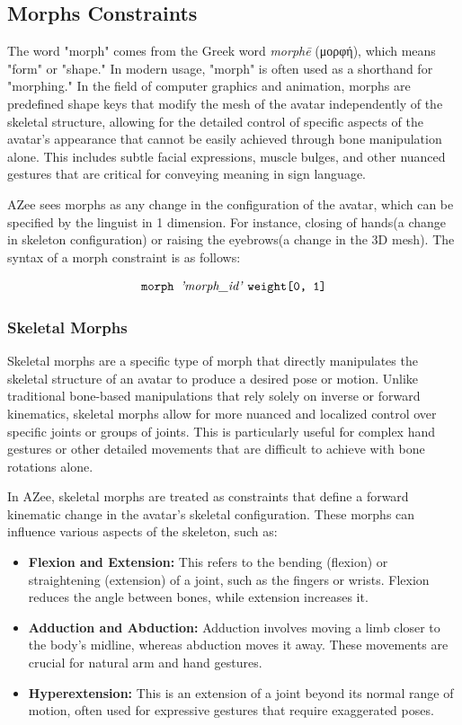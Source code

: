 \documentclass[../../main.tex]{subfiles}
\begin{document}
\subsection{Morphs Constraints}
\label{ch:rigging_layers:proc_rig_signing_avatars:morph_constraints}

The word "morph" comes from the Greek word \textit{morphē} (\textgreek{μορφή}), which means "form" or "shape." In modern usage, "morph" is often used as a shorthand for "morphing." In the field of computer graphics and animation, morphs are predefined shape keys that modify the mesh of the avatar independently of the skeletal structure, allowing for the detailed control of specific aspects of the avatar's appearance that cannot be easily achieved through bone manipulation alone. This includes subtle facial expressions, muscle bulges, and other nuanced gestures that are critical for conveying meaning in sign language.

AZee sees morphs as any change in the configuration of the avatar, which can be specified by the linguist in 1 dimension. For instance, closing of hands(a change in skeleton configuration) or raising the eyebrows(a change in the 3D mesh). The syntax of a morph constraint is as follows:

\[
\texttt{morph } \text{\emph{'morph\_id'}} \ \texttt{weight[0, 1]}
\]

\subsubsection{Skeletal Morphs}
\label{ch:rigging_layers:proc_rig_signing_avatars:morph_constraints:skel_morphs}

Skeletal morphs are a specific type of morph that directly manipulates the skeletal structure of an avatar to produce a desired pose or motion. Unlike traditional bone-based manipulations that rely solely on inverse or forward kinematics, skeletal morphs allow for more nuanced and localized control over specific joints or groups of joints. This is particularly useful for complex hand gestures or other detailed movements that are difficult to achieve with bone rotations alone.

In AZee, skeletal morphs are treated as constraints that define a forward kinematic change in the avatar's skeletal configuration. These morphs can influence various aspects of the skeleton, such as:

\begin{itemize}
    \item \textbf{Flexion and Extension:} This refers to the bending (flexion) or straightening (extension) of a joint, such as the fingers or wrists. Flexion reduces the angle between bones, while extension increases it.
    \item \textbf{Adduction and Abduction:} Adduction involves moving a limb closer to the body's midline, whereas abduction moves it away. These movements are crucial for natural arm and hand gestures.
    \item \textbf{Hyperextension:} This is an extension of a joint beyond its normal range of motion, often used for expressive gestures that require exaggerated poses.
\end{itemize}
\end{document}
